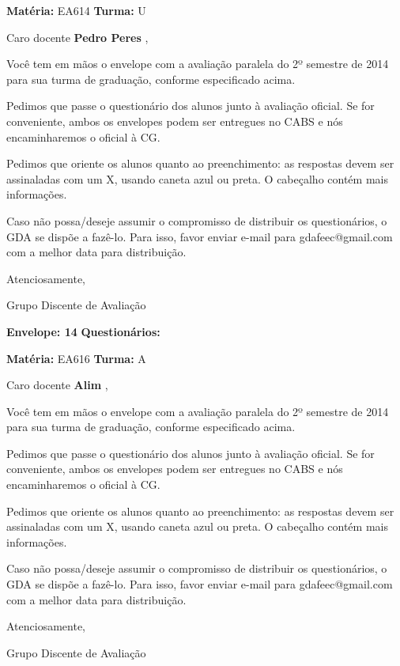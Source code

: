 \documentclass[a5paper]{letter}
\begin{document}
\newpage
\thispagestyle{empty}

\hfill {\bf Matéria:} EA614 {\bf Turma:} U

Caro docente {\bf Pedro Peres }, 

	Você tem em mãos o envelope com a avaliação paralela do 2º semestre de 2014 para sua turma de graduação, conforme especificado acima.

	Pedimos que passe o questionário dos alunos junto à avaliação oficial. Se for conveniente, ambos os envelopes podem ser entregues no CABS e nós encaminharemos o oficial à CG.

Pedimos que oriente os alunos quanto ao preenchimento: as respostas devem ser assinaladas com um X, usando caneta azul ou preta. O cabeçalho contém mais informações.

	Caso não possa/deseje assumir o compromisso de distribuir os questionários, o GDA se dispõe a fazê-lo. Para isso, favor enviar e-mail para gdafeec@gmail.com com a melhor data para distribuição.


Atenciosamente, 

Grupo Discente de Avaliação

\vspace{0.5cm}

{\bf Envelope: 14 }		\hfill	{\bf Questionários:} \hspace{2cm}

\newpage
\thispagestyle{empty}

\hfill {\bf Matéria:} EA616 {\bf Turma:} A

Caro docente {\bf Alim }, 

	Você tem em mãos o envelope com a avaliação paralela do 2º semestre de 2014 para sua turma de graduação, conforme especificado acima.

	Pedimos que passe o questionário dos alunos junto à avaliação oficial. Se for conveniente, ambos os envelopes podem ser entregues no CABS e nós encaminharemos o oficial à CG.

Pedimos que oriente os alunos quanto ao preenchimento: as respostas devem ser assinaladas com um X, usando caneta azul ou preta. O cabeçalho contém mais informações.

	Caso não possa/deseje assumir o compromisso de distribuir os questionários, o GDA se dispõe a fazê-lo. Para isso, favor enviar e-mail para gdafeec@gmail.com com a melhor data para distribuição.


Atenciosamente, 

Grupo Discente de Avaliação
\end{document}

